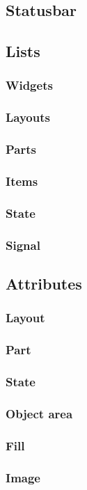 \documentclass[titlepage,oneside,11pt]{book}
\begin{document}
\subsection{Statusbar}
\subsection{Lists}
\subsubsection{Widgets}
\subsubsection{Layouts}
\subsubsection{Parts}
\subsubsection{Items}
\subsubsection{State}
\subsubsection{Signal}
\subsection{Attributes}
\subsubsection{Layout}
\subsubsection{Part}
\subsubsection{State}
\subsubsection{Object area}
\subsubsection{Fill}
\subsubsection{Image}
\end{document}
